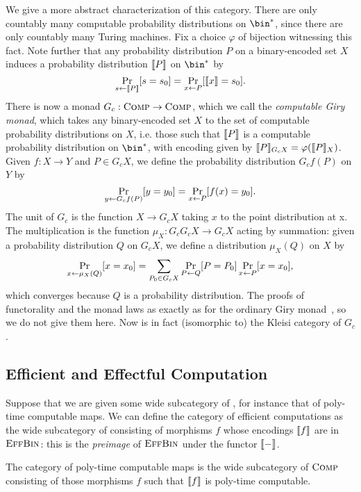 We give a more abstract characterization of this category. There
are only countably many computable probability distributions on $\bin^*$, since
there are only countably many Turing machines. Fix a choice $\varphi$ of
bijection witnessing this fact. Note further that any probability distribution
$P$ on a binary-encoded set $X$ induces a probability distribution
$\llbracket P \rrbracket$ on $\bin^*$ by \[
  \Pr_{s\leftarrow \llbracket P \rrbracket}[s = s_0] = \Pr_{x\leftarrow P}[\llbracket x \rrbracket = s_0].
\]
There is now a monad $G_c: {\textsc{\text{Comp}}}\to{\textsc{\text{Comp}}}$, which we call the
\emph{computable Giry monad}, which takes any binary-encoded set $X$ to the set
of computable probability distributions on $X$, i.e. those such that
$\llbracket P \rrbracket$ is a computable probability distribution on $\bin^*$, with encoding
given by $\llbracket P \rrbracket_{G_c X} = \varphi(\llbracket P \rrbracket_X)$. Given $f: X\to Y$ and
$P\in G_c X$, we define the probability distribution $G_c f(P)$ on $Y$ by
\[
  \Pr_{y\leftarrow G_c f(P)}[y = y_0] = \Pr_{x\leftarrow P}[f(x) = y_0].
\]
The unit of $G_c$ is the function $X\to G_c X$ taking $x$ to the point
distribution at x. The multiplication is the function $\mu_X: G_c G_c X\to G_c X$
acting by summation: given a probability distribution $Q$ on $G_c X$, we define
a distribution $\mu_X (Q)$ on $X$ by \begin{equation}\label{eqn:giry-sum}
  \Pr_{x\leftarrow \mu_X(Q)}[x = x_0] = \sum_{P_0\in G_c X} \Pr_{P\leftarrow Q}[P =
  P_0]\Pr_{x\leftarrow P}[x = x_0],
\end{equation}which converges because $Q$ is a probability distribution. The proofs of
functorality and the monad laws as exactly as for the ordinary Giry
monad~\cite{giry-1982}, so we do not give them here. Now  is in
fact (isomorphic to) the Kleisi category of $G_c$.

\subsection{Efficient and Effectful Computation}

Suppose that we are given some wide subcategory  of ,
for instance that of poly-time computable maps. We can define the category
 of efficient computations as the wide subcategory of 
consisting of morphisms $f$ whose encodings $\llbracket f \rrbracket$ are in ${\textsc{\text{EffBin}}}$:
this is the \emph{preimage} of ${\textsc{\text{EffBin}}}$ under the functor $\llbracket - \rrbracket$.

\begin{dfn}
  The category  of poly-time computable maps is the wide subcategory
  of ${\textsc{\text{Comp}}}$ consisting of those morphisms $f$ such that $\llbracket f \rrbracket$ is
  poly-time computable.
\end{dfn}

